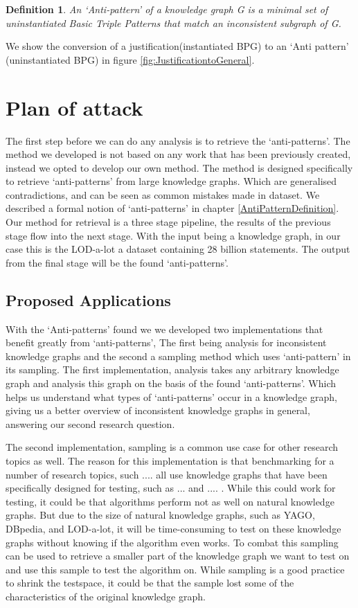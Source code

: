 \documentclass[11pt,letterpaper ,oneside ]{book}
\newtheorem{definition}{Definition}
\begin{document}
\begin{definition} 
	An \textit{`Anti-pattern'} \textit{of a knowledge graph G is a minimal set of uninstantiated Basic Triple Patterns that match an inconsistent subgraph of G.}
\end{definition}

We show the conversion of a justification(instantiated BPG) to an `Anti pattern' (uninstantiated BPG) in figure \ref{fig:JustificationtoGeneral}.


\section{Plan of attack}
The first step before we can do any analysis is to retrieve the `anti-patterns'. The method we developed is not based on any work that has been previously created, instead we opted to develop our own method. The method is designed specifically to retrieve `anti-patterns' from large knowledge graphs. Which are generalised contradictions, and can be seen as common mistakes made in dataset. We described a formal notion of `anti-patterns' in chapter \ref{AntiPatternDefinition}. Our method for retrieval is a three stage pipeline, the results of the previous stage flow into the next stage. With the input being a knowledge graph, in our case this is the LOD-a-lot\cite{JavierD:2017} a dataset containing 28 billion statements. The output from the final stage will be the found `anti-patterns'. 

\subsection{Proposed Applications}
With the `Anti-patterns' found we we developed two implementations that benefit greatly from `anti-patterns', The first being analysis for inconsistent knowledge graphs and the second a sampling method which uses `anti-pattern' in its sampling. The first implementation, analysis takes any arbitrary knowledge graph and analysis this graph on the basis of the found `anti-patterns'. Which helps us understand what types of `anti-patterns' occur in a knowledge graph, giving us a better overview of inconsistent knowledge graphs in general, answering our second research question.

The second implementation, sampling is a common use case for other research topics as well. The reason for this implementation is that benchmarking for a number of research topics, such .... all use knowledge graphs that have been specifically designed for testing, such as ... and  .... . While this could work for testing, it could be that algorithms perform not as well on natural knowledge graphs. But due to the size of natural knowledge graphs, such as YAGO, DBpedia, and LOD-a-lot, it will be time-consuming to test on these knowledge graphs without knowing if the algorithm even works. To combat this sampling can be used to retrieve a smaller part of the knowledge graph we want to test on and use this sample to test the algorithm on. While sampling is a good practice to shrink the testspace, it could be that the sample lost some of the characteristics of the original knowledge graph. 
\end{document}
